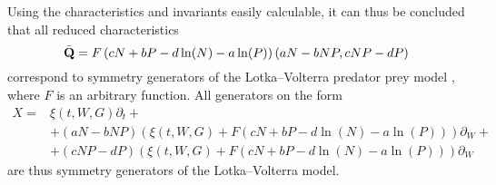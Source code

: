 Using the characteristics and invariants easily calculable, it can thus be concluded that all reduced characteristics
\begin{equation} \label{eq:lotka-volterra-characteristic}
  \bar{\vb{Q}} = F\left(cN + bP - d \ln(N) - a \ln(P)\right) \left(a N - b N P, c N P - d P\right)
\end{equation}
correspond to symmetry generators of the Lotka--Volterra predator prey model , where \(F\) is an arbitrary function.
All generators on the form
\begin{align}
  X =& \xi(t, W, G) \partial_t + \\
  &+ \left(a N - b N P\right) \left(\xi(t, W, G) + F\left(cN + bP - d \ln(N) - a \ln(P)\right)\right) \partial_W + \\
  &+ \left(c N P - d P\right) \left(\xi(t, W, G) + F\left(cN + bP - d \ln(N) - a \ln(P)\right)\right) \partial_W
\end{align}
are thus symmetry generators of the Lotka--Volterra model.

